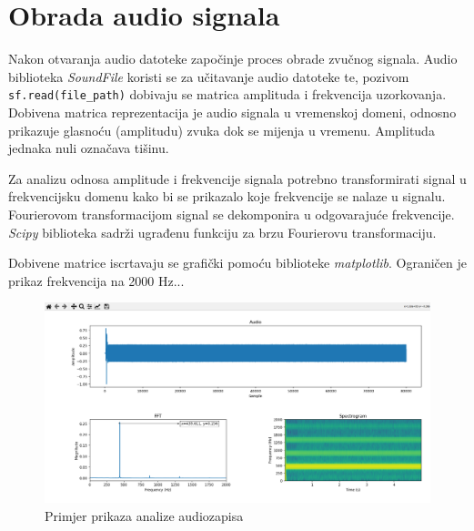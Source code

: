 \chapter{Obrada audio signala}

Nakon otvaranja audio datoteke započinje proces obrade zvučnog signala. Audio biblioteka \textit{SoundFile} koristi se za učitavanje audio datoteke te, pozivom \lstinline|sf.read(file_path)| dobivaju se matrica amplituda i frekvencija uzorkovanja. Dobivena matrica reprezentacija je audio signala u vremenskoj domeni, odnosno prikazuje glasnoću (amplitudu) zvuka dok se mijenja u vremenu. Amplituda jednaka nuli označava tišinu.

Za analizu odnosa amplitude i frekvencije signala potrebno transformirati signal u frekvencijsku domenu kako bi se prikazalo koje frekvencije se nalaze u signalu. Fourierovom transformacijom signal se dekomponira u odgovarajuće frekvencije. \textit{Scipy} biblioteka sadrži ugrađenu funkciju za brzu Fourierovu transformaciju.

Dobivene matrice iscrtavaju se grafički pomoću biblioteke \textit{matplotlib}. Ograničen je prikaz frekvencija na 2000 Hz...


\begin{figure}[ht]
	\includegraphics[width=\linewidth]{imgs/analyse_example}
	\caption{Primjer prikaza analize audiozapisa}
	\label{fig:analyse_example}
\end{figure}
